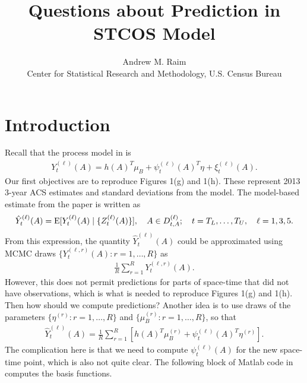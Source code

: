 \documentclass[10pt]{article}
\title{Questions about Prediction in STCOS Model}
\author{Andrew M. Raim
\vspace{0.5em} \\
Center for Statistical Research and Methodology, U.S. Census Bureau
}
\begin{document}
\maketitle

\section{Introduction}
\label{sec:intro}
Recall that the process model in \citet{BradleyEtAl2016-STAT} is
%
\begin{align*}
Y_t^{(\ell)}(A) = h(A)^T \mu_B + \psi_t^{(\ell)}(A)^T \eta + \xi_t^{(\ell)}(A).
\end{align*}
%
Our first objectives are to reproduce Figures 1(g) and 1(h). These represent 2013 3-year ACS estimates and standard deviations from the model. The model-based estimate from the paper is written as
%
\begin{align*}
\hat{Y}_t^{(\ell)}(A) = \operatorname{E}[ Y_t^{(\ell)}(A) \mid \{ Z_t^{(\ell)}(A) \} ],
\quad A \in D_{t,A}^{(\ell)};
\quad t = T_L, \ldots, T_U, 
\quad \ell = 1,3,5.
\end{align*}
%
From this expression, the quantity $\hat{Y}_t^{(\ell)}(A)$ could be approximated using MCMC draws $\{ Y_t^{(\ell, r)}(A) : r = 1, \ldots, R \}$ as
%
\begin{align*}
\frac{1}{R} \sum_{r=1}^R Y_t^{(\ell, r)}(A).
\end{align*}
%
However, this does not permit predictions for parts of space-time that did not have observations, which is what is needed to reproduce Figures 1(g) and 1(h). Then how should we compute predictions? Another idea is to use draws of the parameters $\{ \eta^{(r)} : r = 1, \ldots, R \}$ and $\{ \mu_B^{(r)} : r = 1, \ldots, R \}$, so that
%
\begin{align}
\hat{Y}_t^{(\ell)}(A) = \frac{1}{R} \sum_{r=1}^R \left[ h(A)^T \mu_B^{(r)} + \psi_t^{(\ell)}(A)^T \eta^{(r)} \right].
\label{eqn:predict-mcmc}
\end{align}
%
The complication here is that we need to compute $\psi_t^{(\ell)}(A)$ for the new space-time point, which is also not quite clear. The following block of Matlab code in  computes the basis functions.
\end{document}
